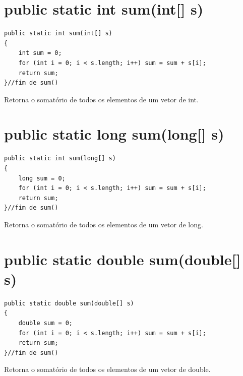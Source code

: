 \documentclass[a4paper,12pt,openany]{book}
\begin{document}
\section*{public static int sum(int[] s)}

\begin{lstlisting}
public static int sum(int[] s)
{
	int sum = 0;
	for (int i = 0; i < s.length; i++) sum = sum + s[i];
	return sum;
}//fim de sum()
\end{lstlisting} 

Retorna o somatório de todos os elementos de um vetor de int.

\section*{public static long sum(long[] s)}

\begin{lstlisting}
public static int sum(long[] s)
{
	long sum = 0;
	for (int i = 0; i < s.length; i++) sum = sum + s[i];
	return sum;
}//fim de sum()
\end{lstlisting} 

Retorna o somatório de todos os elementos de um vetor de long.

\section*{public static double sum(double[] s)}

\begin{lstlisting}
public static double sum(double[] s)
{
	double sum = 0;
	for (int i = 0; i < s.length; i++) sum = sum + s[i];
	return sum;
}//fim de sum()
\end{lstlisting} 

Retorna o somatório de todos os elementos de um vetor de double.

\end{document}

